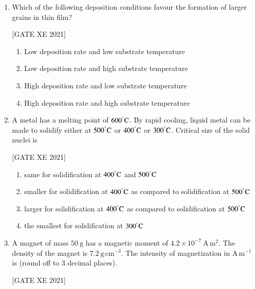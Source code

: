 \documentclass[journal,12pt,onecolumn]{IEEEtran}
\theoremstyle{remark}
\begin{document}
\begin{enumerate}
\item Which of the following deposition conditions favour the formation of larger grains in thin film?

\hfill[GATE XE 2021]

\begin{multicols}{2}
\begin{enumerate}
\item Low deposition rate and low substrate temperature
\item Low deposition rate and high substrate temperature
\item High deposition rate and low substrate temperature
\item High deposition rate and high substrate temperature
\end{enumerate}
\end{multicols}



\item A metal has a melting point of $600^\degree\text{C}$. By rapid cooling, liquid metal can be made to solidify either at $500^\degree\text{C}$ or $400^\degree\text{C}$ or $300^\degree\text{C}$. Critical size of the solid nuclei is

\hfill[GATE XE 2021]

\begin{multicols}{2}
\begin{enumerate}
\item same for solidification at $400^\degree\text{C}$ and $500^\degree\text{C}$
\item smaller for solidification at $400^\degree\text{C}$ as compared to solidification at $500^\degree\text{C}$
\item larger for solidification at $400^\degree\text{C}$ as compared to solidification at $500^\degree\text{C}$
\item the smallest for solidification at $300^\degree\text{C}$
\end{enumerate}
\end{multicols}


\item A magnet of mass $50\ \text{g}$ has a magnetic moment of $4.2\times 10^{-7}\ \text{A}\,\text{m}^2$. The density of the magnet is $7.2\ \text{g}\,\text{cm}^{-3}$. The intensity of magnetization in $\text{A}\,\text{m}^{-1}$ is \underline{\hspace{2cm}} (round off to 3 decimal places).

\hfill[GATE XE 2021]

\end{enumerate}
\end{document}
